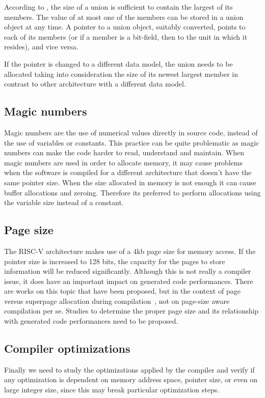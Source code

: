 \documentclass[a4paper,conference]{IEEEtran}
\newcommand{\riscv}{\textsc{\small RISC-V}\xspace}
\begin{document}
According to \cite{ansiC17}, the size of a union is sufficient to contain the largest of its members. The value of at most one of the members can be stored in a union object at any time. A pointer to a union object, suitably converted, points to each of its members (or if a member is a bit-field, then to the unit in which it resides), and vice versa.

If the pointer is changed to a different data model, the union needs to be allocated taking into consideration the size of its newest largest member in contrast to other architecture with a different data model.

\subsection{Magic numbers}

Magic numbers are the use of numerical values directly in source code, instead of the use of variables or constants. This practice can be quite problematic as magic numbers can make the code harder to read, understand and maintain. 
When magic numbers are used in order to allocate memory, it may cause problems when the software is compiled for a different architecture that doesn't have the same pointer size.  When the size allocated in memory is not enough it can cause buffer allocations and zeroing. Therefore its preferred to perform allocations using the variable size instead of a constant.

\subsection{Page size}
The \riscv architecture makes use of a 4kb page size for memory access. If the pointer size is increased to  128 bits, the capacity for the pages to store information will be reduced significantly.
Although this is not really a compiler issue, it does have an important impact on generated code performances. There are works on this topic that have been proposed, but in the context of page versus superpage allocation during compilation~\cite{magee2009case}, not on page-size aware compilation per se.
Studies to determine the proper page size and its relationship with generated code performances need to be proposed.

\subsection{Compiler optimizations}

Finally we need to study the optimizations applied by the compiler and verify if any optimization is dependent on memory address space, pointer size, or even on large integer size, since this may break particular optimization steps.
\end{document}
